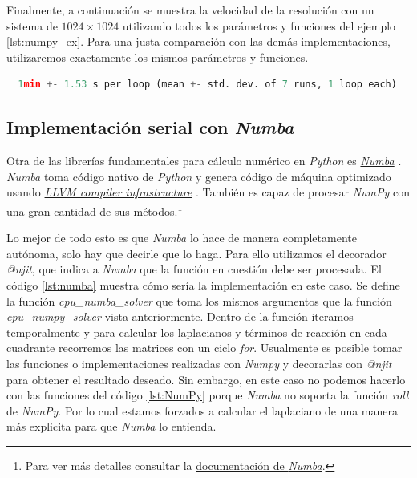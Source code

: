 Finalmente, a continuación se muestra la velocidad de la resolución con un sistema de $1024\times 1024$ utilizando todos los parámetros y funciones 
del ejemplo \ref{lst:numpy_ex}. Para una justa comparación con las demás implementaciones, utilizaremos exactamente los mismos parámetros y funciones.
\begin{lstlisting}[language=Python,label = {lst:numpy_re}]
  %timeit cpu_numpy_solver(u,v,fu,fv,Ds)
  1min +- 1.53 s per loop (mean +- std. dev. of 7 runs, 1 loop each)
\end{lstlisting}

\subsection{Implementación serial con \textit{Numba}}

Otra de las librerías fundamentales para cálculo numérico en \textit{Python} es \href{https://numba.pydata.org/}{\textit{Numba}} \cite{numba}. \textit{Numba} toma código 
nativo de \textit{Python} y genera código de máquina optimizado usando \href{https://llvm.org/}{\textit{LLVM compiler infrastructure}} \cite{LLVM}. También es capaz de 
procesar \textit{NumPy} con una gran cantidad de sus métodos.\footnote{Para ver más detalles consultar la 
\href{https://numba.readthedocs.io/en/stable/reference/numpysupported.html}{documentación de \textit{Numba}}.} 

Lo mejor de todo esto es que \textit{Numba} lo hace de manera completamente autónoma, solo hay que decirle que lo haga. Para ello utilizamos el decorador 
\textit{@njit}, que indica a \textit{Numba} que la función en cuestión debe ser procesada. El código \ref{lst:numba} muestra cómo sería la 
implementación en este caso. Se define la función \textit{cpu\_numba\_solver} que toma los mismos argumentos que la función \textit{cpu\_numpy\_solver} 
vista anteriormente. Dentro de la función iteramos temporalmente y para calcular los laplacianos y términos de reacción en cada cuadrante
recorremos las matrices con un ciclo \textit{for}. Usualmente es posible 
tomar las funciones o implementaciones realizadas con \textit{Numpy} y decorarlas con \textit{@njit} para obtener el resultado deseado. Sin embargo, 
en este caso no podemos hacerlo con las funciones del código \ref{lst:NumPy} porque \textit{Numba} no soporta la función \textit{roll} de \textit{NumPy}. Por 
lo cual estamos forzados a calcular el laplaciano de una manera más explicita para que \textit{Numba} lo entienda.    

